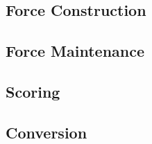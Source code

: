 

\subsection{Force Construction}
\label{subsec:event_force_construction}



\subsection{Force Maintenance}
\label{subsec:event_force_maintenance}



\subsection{Scoring}



\subsection{Conversion}


